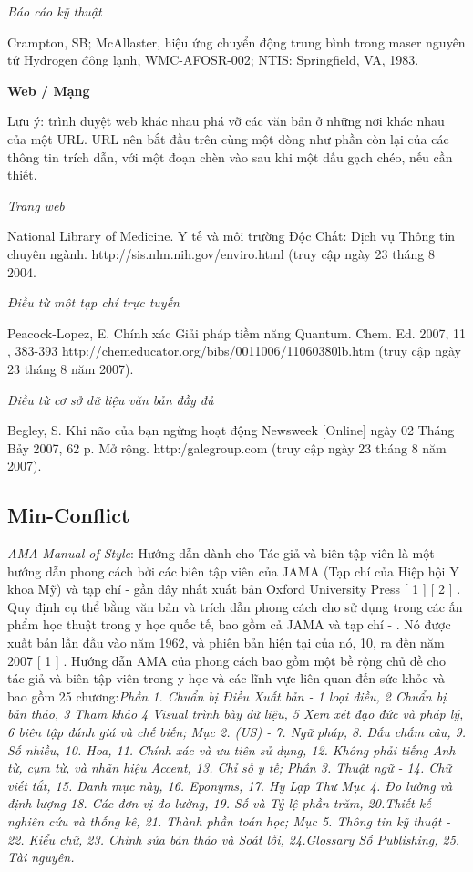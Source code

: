 \documentclass{hcmutarticle}
\begin{document}
{\em Báo cáo kỹ thuật }

Crampton, SB; McAllaster, hiệu ứng chuyển động trung bình trong maser nguyên tử Hydrogen đông lạnh, WMC-AFOSR-002; NTIS: Springfield, VA, 1983.

{\bfseries Web / Mạng}

Lưu ý: trình duyệt web khác nhau phá vỡ các văn bản ở những nơi khác nhau của một URL. URL nên bắt đầu trên cùng một dòng như phần còn lại của các thông tin trích dẫn, với một đoạn chèn vào sau khi một dấu gạch chéo, nếu cần thiết.

{\em Trang web}

National Library of Medicine. Y tế và môi trường Độc Chất: Dịch vụ Thông tin chuyên ngành. http://sis.nlm.nih.gov/enviro.html (truy cập ngày 23 tháng 8 2004.

{\em Điều từ một tạp chí trực tuyến}

Peacock-Lopez, E. Chính xác Giải pháp tiềm năng Quantum. Chem. Ed. 2007, 11 , 383-393 http://chemeducator.org/bibs/0011006/11060380lb.htm (truy cập ngày 23 tháng 8 năm 2007).

{\em Điều từ cơ sở dữ liệu văn bản đầy đủ}

Begley, S. Khi não của bạn ngừng hoạt động Newsweek [Online] ngày 02 Tháng Bảy 2007, 62 p. Mở rộng. http:/galegroup.com (truy cập ngày 23 tháng 8 năm 2007).



\subsection{Min-Conflict}

{\em AMA Manual of Style}: Hướng dẫn dành cho Tác giả và biên tập viên là một hướng dẫn phong cách bởi các biên tập viên của JAMA (Tạp chí của Hiệp hội Y khoa Mỹ) và tạp chí - gần đây nhất xuất bản Oxford University Press [ 1 ] [ 2 ] . Quy định cụ thể bằng văn bản và trích dẫn phong cách cho sử dụng trong các ấn phẩm học thuật trong y học quốc tế, bao gồm cả JAMA và tạp chí - . Nó được xuất bản lần đầu vào năm 1962, và phiên bản hiện tại của nó, 10, ra đến năm 2007 [ 1 ] . Hướng dẫn AMA của phong cách bao gồm một bề rộng chủ đề cho tác giả và biên tập viên trong y học và các lĩnh vực liên quan đến sức khỏe và bao gồm 25 chương:{\em Phần 1. Chuẩn bị Điều Xuất bản - 1 loại điều, 2 Chuẩn bị bản thảo, 3 Tham khảo 4 Visual trình bày dữ liệu, 5 Xem xét đạo đức và pháp lý, 6 biên tập đánh giá và chế biến; Mục 2. (US) - 7. Ngữ pháp, 8. Dấu chấm câu, 9. Số nhiều, 10. Hoa, 11. Chính xác và ưu tiên sử dụng, 12. Không phải tiếng Anh từ, cụm từ, và nhãn hiệu Accent, 13. Chỉ số y tế; Phần 3. Thuật ngữ - 14. Chữ viết tắt, 15. Danh mục này, 16. Eponyms, 17. Hy Lạp Thư Mục 4. Đo lường và định lượng 18. Các đơn vị đo lường, 19. Số và Tỷ lệ phần trăm, 20.Thiết kế nghiên cứu và thống kê, 21. Thành phần toán học; Mục 5. Thông tin kỹ thuật - 22. Kiểu chữ, 23. Chỉnh sửa bản thảo và Soát lỗi, 24.Glossary Số Publishing, 25. Tài nguyên.}
\end{document}
